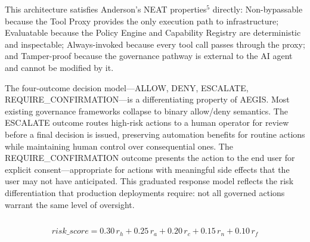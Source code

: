 \documentclass{IEEEcsmag}
\begin{document}
This architecture satisfies Anderson's NEAT properties$^{5}$ directly: Non-bypassable because the Tool Proxy provides the only execution path to infrastructure; Evaluatable because the Policy Engine and Capability Registry are deterministic and inspectable; Always-invoked because every tool call passes through the proxy; and Tamper-proof because the governance pathway is external to the AI agent and cannot be modified by it.

The four-outcome decision model---ALLOW, DENY, ESCALATE, REQUIRE\_CONFIRMATION---is a differentiating property of AEGIS. Most existing governance frameworks collapse to binary allow/deny semantics. The ESCALATE outcome routes high-risk actions to a human operator for review before a final decision is issued, preserving automation benefits for routine actions while maintaining human control over consequential ones. The REQUIRE\_CONFIRMATION outcome presents the action to the end user for explicit consent---appropriate for actions with meaningful side effects that the user may not have anticipated. This graduated response model reflects the risk differentiation that production deployments require: not all governed actions warrant the same level of oversight.

\subsection{}

\[risk\_score = 0.30\,r_h + 0.25\,r_a + 0.20\,r_c + 0.15\,r_n + 0.10\,r_f\]
\end{document}
